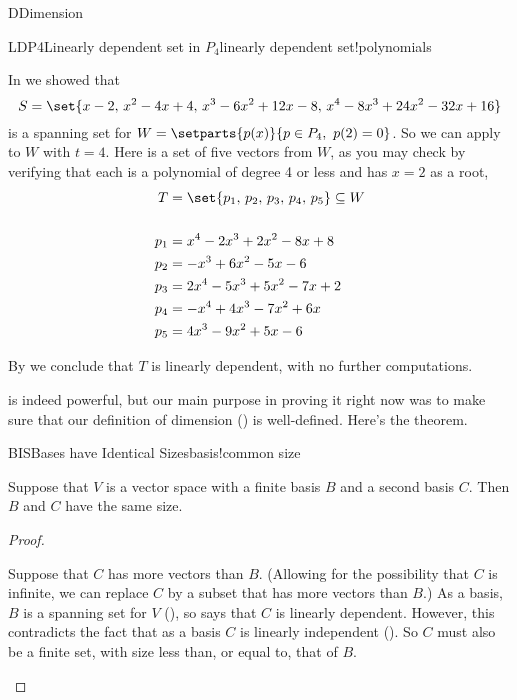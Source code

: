 \begin{subsect}{D}{Dimension}
%
\begin{example}{LDP4}{Linearly dependent set in $P_4$}{linearly dependent set!polynomials}
\begin{para}In  we showed that
%
\begin{equation*}
S=\set{x-2,\,x^2-4x+4,\,x^3-6x^2+12x-8,\,x^4-8x^3+24x^2-32x+16}
\end{equation*}
%
is a spanning set for $W=\setparts{p(x)}{p\in P_4,\ p(2)=0}$.  So we can apply  to $W$ with $t=4$.  Here is a set of five vectors from $W$, as you may check by verifying that each is a polynomial of degree 4 or less and has $x=2$ as a root,
%
\begin{align*}
T&=\set{p_1,\,p_2,\,p_3,\,p_4,\,p_5}\subseteq W\\
&\ \\
p_1&=x^4-2x^3+2x^2-8x+8\\
p_2&=-x^3+6x^2-5x-6\\
p_3&=2x^4-5x^3+5x^2-7x+2\\
p_4&=-x^4+4x^3-7x^2+6x\\
p_5&=4x^3-9x^2+5x-6
\end{align*}
\end{para}
%
\begin{para}By  we conclude that $T$ is linearly dependent, with no further computations.
\end{para}
\end{example}
%
\begin{para} is indeed powerful, but our main purpose in proving it right now was to make sure that our definition of dimension () is well-defined.  Here's the theorem.\end{para}
%
%
\begin{theorem}{BIS}{Bases have Identical Sizes}{basis!common size}
\begin{para}Suppose that $V$ is a vector space with a finite basis $B$ and a second basis $C$.  Then $B$ and $C$ have the same size.\end{para}
\end{theorem}
%
\begin{proof}
\begin{para}Suppose that $C$ has more vectors than $B$.  (Allowing for the possibility that $C$ is infinite, we can replace $C$ by a subset that has more vectors than $B$.)  As a basis, $B$ is a spanning set for $V$ (), so  says that $C$ is linearly dependent.  However, this contradicts the fact that as a basis $C$ is linearly independent ().  So $C$ must also be a finite set, with size less than, or equal to, that of $B$.\end{para}

\end{proof}
\end{subsect}
